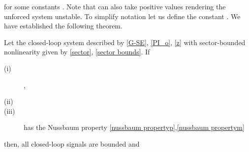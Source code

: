 \documentclass[preprint,12pt]{article}
\begin{document}
for some constants . Note that  can also take positive values rendering the unforced system unstable. To simplify notation let us define the constant .
We have established the following theorem.
\begin{theorem}\label{main_theorem}
Let the closed-loop system described by \eqref{G-SE}, \eqref{PI_o}, \eqref{z} with sector-bounded nonlinearity given by \eqref{sector}, \eqref{sector bounds}. If
\begin{description}
  \item[(i)] , 
  \item[(ii)] 
  \item[(iii)]  has the  Nussbaum property \eqref{nussbaum propertyp},\eqref{nussbaum propertym}
\end{description}
then, all closed-loop signals are bounded and 
\end{theorem}
\end{document}
